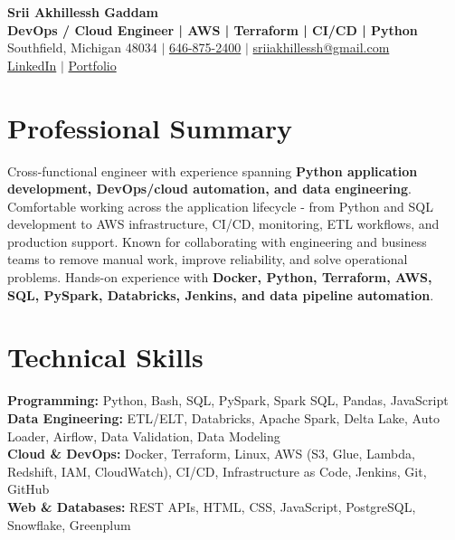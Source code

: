 \documentclass[letterpaper,10pt]{article}
\begin{document}
\fontsize{9.35pt}{10.45pt}\selectfont

\begin{center}
    {\LARGE \textbf{Srii Akhillessh Gaddam}} \\[-1pt]
    \textbf{DevOps / Cloud Engineer | AWS | Terraform | CI/CD | Python} \\[2pt]
    Southfield, Michigan 48034 $|$
    \href{tel:6468752400}{646-875-2400} $|$
    \href{mailto:sriiakhillessh@gmail.com}{sriiakhillessh@gmail.com} \\[1pt]
    \href{https://www.linkedin.com/in/srii-akhiilessh-gaddam-b48668191/}{LinkedIn} $|$
    \href{https://sriiakhillesshg.github.io/portfolio/}{Portfolio}
\end{center}
\vspace{-8pt}

\section{Professional Summary}
\small{Cross-functional engineer with experience spanning \textbf{Python application development, DevOps/cloud automation, and data engineering}. Comfortable working across the application lifecycle - from Python and SQL development to AWS infrastructure, CI/CD, monitoring, ETL workflows, and production support. Known for collaborating with engineering and business teams to remove manual work, improve reliability, and solve operational problems. Hands-on experience with \textbf{Docker, Python, Terraform, AWS, SQL, PySpark, Databricks, Jenkins, and data pipeline automation}.}

\section{Technical Skills}
\small{
\textbf{Programming:} Python, Bash, SQL, PySpark, Spark SQL, Pandas, JavaScript \\
\textbf{Data Engineering:} ETL/ELT, Databricks, Apache Spark, Delta Lake, Auto Loader, Airflow, Data Validation, Data Modeling \\
\textbf{Cloud \& DevOps:} Docker, Terraform, Linux, AWS (S3, Glue, Lambda, Redshift, IAM, CloudWatch), CI/CD, Infrastructure as Code, Jenkins, Git, GitHub \\
\textbf{Web \& Databases:} REST APIs, HTML, CSS, JavaScript, PostgreSQL, Snowflake, Greenplum
}
\end{document}

